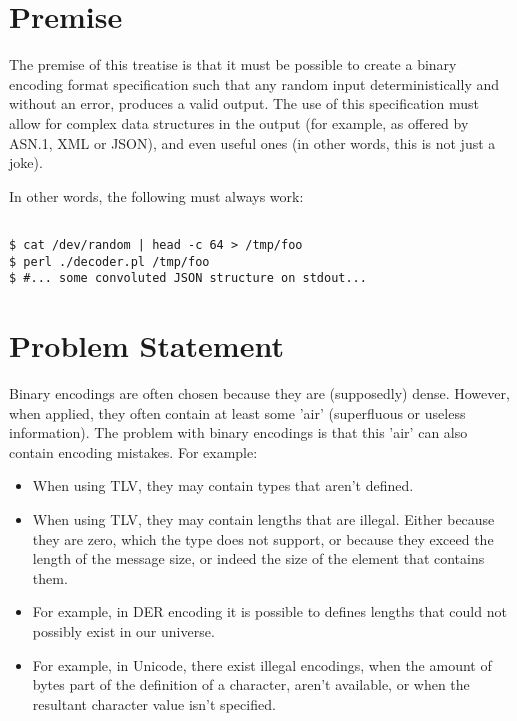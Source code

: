 \section{Premise}

The premise of this treatise is that it must be possible to create
a binary encoding format specification such that any random input 
deterministically and without an error, produces a valid output.
The use of this specification must allow for complex data structures
in the output (for example, as offered by ASN.1, XML or JSON),
and even useful ones (in other words, this is not just a joke).

In other words, the following must always work:

\begin{changemargin}{-60mm}{0mm}
\begin{myquote}
\begin{verbatim}

$ cat /dev/random | head -c 64 > /tmp/foo
$ perl ./decoder.pl /tmp/foo
$ #... some convoluted JSON structure on stdout...

\end{verbatim}
\end{myquote}
\end{changemargin}

\section{Problem Statement}

Binary encodings are often chosen because they are (supposedly) dense.
However, when applied, they often contain at least some 'air'
(superfluous or useless information).
The problem with binary encodings is that this 'air' can also contain
encoding mistakes. For example:

\begin{itemize}
\item When using TLV, they may contain types that aren't defined.
\item When using TLV, they may contain lengths that are illegal.
  Either because they are zero, which the type does not support,
  or because they exceed the length of the message size, or indeed
  the size of the element that contains them.
\item For example, in DER encoding it is possible to defines lengths
  that could not possibly exist in our universe.
\item For example, in Unicode, there exist illegal encodings, when the
  amount of bytes part of the definition of a character, aren't
  available, or when the resultant character value isn't specified.
\end{itemize}

